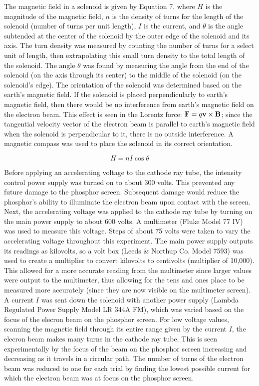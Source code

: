 \documentclass[%
 aip,
 amsmath,amssymb,
 reprint,%
floatfix,
]{revtex4-1}
\begin{document}
The magnetic field in a solenoid is given by Equation 7, where $H$ is the magnitude of the magnetic field, $n$ is the density of turns for the length of the solenoid (number of turns per unit length), $I$ is the current, and $\theta$ is the angle subtended at the center of the solenoid by the outer edge of the solenoid and its axis\cite{oxymanual}. The turn density was measured by counting the number of turns for a select unit of length, then extrapolating this small turn density to the total length of the solenoid. The angle $\theta$ was found by measuring the angle from the end of the solenoid (on the axis through its center) to the middle of the solenoid (on the solenoid's edge). The orientation of the solenoid was determined based on the earth's magnetic field. If the solenoid is placed perpendicularly to earth's magnetic field, then there would be no interference from earth's magnetic field on the electron beam. This effect is seen in the Lorentz force: $\bold{F} = q\bold{v} \times \bold{B}$; since the tangential velocity vector of the electron beam is parallel to earth's magnetic field when the solenoid is perpendicular to it, there is no outside interference. A magnetic compass was used to place the solenoid in its correct orientation.

\begin{equation}
	H = nI\cos{\theta}
\end{equation}

Before applying an accelerating voltage to the cathode ray tube, the intensity control power supply was turned on to about 300 volts. This prevented any future damage to the phosphor screen. Subsequent damage would reduce the phosphor's ability to illuminate the electron beam upon contact with the screen. Next, the accelerating voltage was applied to the cathode ray tube by turning on the main power supply to about 600 volts. A multimeter (Fluke Model 77 IV) was used to measure this voltage. Steps of about 75 volts were taken to vary the accelerating voltage throughout this experiment. The main power supply outputs its readings as kilovolts, so a volt box (Leeds \& Northup Co. Model 7593) was used to create a multiplier to convert kilovolts to centivolts (multiplier of 10,000). This allowed for a more accurate reading from the multimeter since larger values were output to the multimeter, thus allowing for the tens and ones place to be measured more accurately (since they are now visible on the multimeter screen). A current $I$ was sent down the solenoid with another power supply (Lambda Regulated Power Supply Model LR 344A FM), which was varied based on the focus of the elecron beam on the phosphor screen. For low voltage values, scanning the magnetic field through its entire range given by the current $I$, the elecron beam makes many turns in the cathode ray tube. This is seen experimentally by the focus of the beam on the phosphor screen increasing and decreasing as it travels in a circular path. The number of turns of the electron beam was reduced to one for each trial by finding the lowest possible current for which the electron beam was at focus on the phosphor screen.
\end{document}
